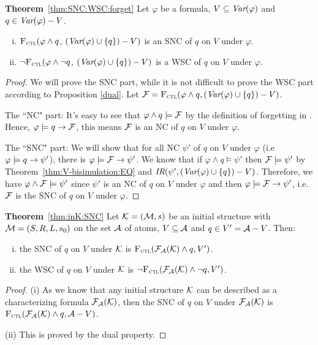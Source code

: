 \documentclass[twoside,11pt]{article}
\begin{document}
	
	
	\noindent\textbf{Theorem}~\ref{thm:SNC:WSC:forget} Let $\varphi$ be a formula, $V\subseteq\textit{Var}(\varphi)$ and $q\in\textit{Var}(\varphi)- V$.
	\begin{enumerate}[(i)]
		\item ${\textsc{F}_{\textsc{ctl}}} (\varphi \land q$, $(\textit{Var}(\varphi) \cup \{q\})- V)$
		is an SNC of $q$ on $V$ under $\varphi$.
		\item  $\neg{\textsc{F}_{\textsc{ctl}}} (\varphi \land \neg q$, $(\textit{Var}(\varphi) \cup \{q\})- V)$
		is a WSC of $q$ on $V$ under $\varphi$.
	\end{enumerate}
	
	\begin{proof}
		We will prove the SNC part, while it is not difficult to prove the WSC part according to Proposition \ref{dual}.
		Let ${\cal F}={\textsc{F}_{\textsc{ctl}}}(\varphi \wedge q, (\textit{Var}(\varphi) \cup \{q\})- V)$.
		
		The ``NC" part: It's easy to see that $\varphi \wedge q \models {\cal F}$ by the definition of forgetting in \CTL. Hence, $\varphi\models q \rightarrow {\cal F}$, this means
		${\cal F}$ is an NC of $q$ on $V$ under $\varphi$.
		
		
		The ``SNC" part: We will show that for all NC $\psi'$ of $q$ on $V$ under $\varphi$ (i.e $\varphi\models q \rightarrow \psi'$), there is $\varphi \models {\cal F} \rightarrow \psi'$.
		We know that if $\varphi \wedge q \models \psi'$ then ${\cal F} \models \psi'$ by Theorem~\ref{thm:V-bisimulation:EQ} and $\emph{IR}(\psi', (\textit{Var}(\varphi) \cup \{q\})- V)$. Therefore, we have $\varphi \wedge {\cal F} \models \psi'$ since $\psi'$ is an NC of $q$ on $V$ under $\varphi$ and then $\varphi \models {\cal F} \rightarrow \psi'$, i.e.  ${\cal F}$ is the SNC of $q$ on $V$ under $\varphi$.
	\end{proof}
	
	
	\noindent \textbf{Theorem}~\ref{thm:inK:SNC} Let ${\cal K}= ({\cal M}, s)$ be an initial structure with ${\cal M}=(S,R,L,s_0)$ on the set ${\cal A}$ of atoms, $V \subseteq {\cal A}$ and $q\in V' = {\cal A} - V$. Then:
	\begin{enumerate}[(i)]
		\item the SNC of $q$ on $V$ under ${\cal K}$ is ${\textsc{F}_{\textsc{ctl}}}({\cal F}_{{\cal A}}({\cal K}) \wedge q, V')$.
		\item the WSC of $q$ on $V$ under ${\cal K}$ is $\neg {\textsc{F}_{\textsc{ctl}}}({\cal F}_{{\cal A}}({\cal K}) \wedge \neg q, V')$.
	\end{enumerate}
	\begin{proof}
		(i)
		As we know that any initial structure ${\cal K}$ can be described as a characterizing formula ${\cal F}_{{\cal A}}({\cal K})$, then the SNC of $q$ on $V$ under ${\cal F}_{{\cal A}}({\cal K})$ is ${\textsc{F}_{\textsc{ctl}}}({\cal F}_{{\cal A}}({\cal K}) \wedge q, {\cal A} - V)$.
		
		
		(ii) This is proved by the dual property.
	\end{proof}
	
	
\end{document}
